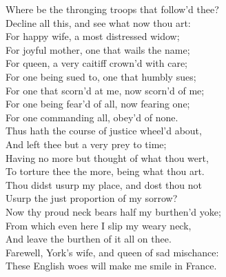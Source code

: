 \documentclass{article}
\begin{document}
\begin{description}
\hspace{1pt}Where be the thronging troops that follow'd thee?\\
\hspace{1pt}Decline all this, and see what now thou art:\\
\hspace{1pt}For happy wife, a most distressed widow;\\
\hspace{1pt}For joyful mother, one that wails the name;\\
\hspace{1pt}For queen, a very caitiff crown'd with care;\\
\hspace{1pt}For one being sued to, one that humbly sues;\\
\hspace{1pt}For one that scorn'd at me, now scorn'd of me;\\
\hspace{1pt}For one being fear'd of all, now fearing one;\\
\hspace{1pt}For one commanding all, obey'd of none.\\
\hspace{1pt}Thus hath the course of justice wheel'd about,\\
\hspace{1pt}And left thee but a very prey to time;\\
\hspace{1pt}Having no more but thought of what thou wert,\\
\hspace{1pt}To torture thee the more, being what thou art.\\
\hspace{1pt}Thou didst usurp my place, and dost thou not\\
\hspace{1pt}Usurp the just proportion of my sorrow?\\
\hspace{1pt}Now thy proud neck bears half my burthen'd yoke;\\
\hspace{1pt}From which even here I slip my weary neck,\\
\hspace{1pt}And leave the burthen of it all on thee.\\
\hspace{1pt}Farewell, York's wife, and queen of sad mischance:\\
\hspace{1pt}These English woes will make me smile in France.\\
\end{description}
\end{document}
